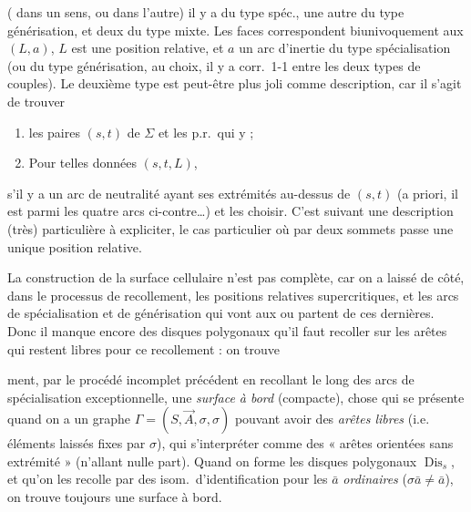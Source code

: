 \documentclass[11pt,a4paper]{article}
\begin{document}
( \struck{\ill{}} dans un sens, ou dans l'autre) \struck{\ill{}}  il y a   du type spéc., une autre du type générisation, et deux du type mixte. Les faces correspondent biunivoquement aux \struck{\ill{}}  $(L, a)$,  $L$ est une position relative, et $a$ un arc  d'inertie du type spécialisation (ou du type générisation, au choix, il y a corr.\ 1-1 entre les deux types de couples). Le deuxième type est peut-être plus joli comme description, car il s'agit de trouver
\begin{enumerate}
\item[a)] les paires  $(s, t)$   de $\Sigma$ et les p.r.\ qui y  ;
\item[b)] Pour \struck{\ill{}} telles données $(s, t, L)$,
\end{enumerate}

s'il y a un arc de neutralité ayant \struck{\ill{}} ses extrémités au-dessus de $(s, t)$ (a priori, il est parmi les quatre arcs ci-contre\ldots) et les choisir. C'est suivant une description (très) particulière à expliciter, le cas particulier où par deux sommets  passe une unique position relative.

La construction de la surface cellulaire n'est pas complète, car on a laissé de côté, dans le processus de recollement, les positions relatives supercritiques, et les arcs de spécialisation et de générisation qui vont aux ou partent de ces dernières. Donc \struck{\ill{}} il manque encore des disques polygonaux qu'il faut recoller sur les arêtes qui restent libres pour ce recollement : on trouve 

ment, par le procédé incomplet précédent en recollant le long des arcs de spécialisation exceptionnelle, une \emph{surface à bord}  (compacte), chose qui se présente quand on a un graphe $\Gamma = (S, \vec{A}, \sigma, \sigma)$ pouvant avoir des  \emph{arêtes libres} (i.e.\  éléments  laissés fixes par $\sigma$), qui \struck{\ill{}}  s'interpréter comme des « arêtes orientées sans extrémité » (n'allant nulle part). Quand on forme les disques polygonaux $\operatorname{Dis}_s$, et qu'on les recolle par des isom.\ d'identification pour les $\bar{a}$ \emph{ordinaires} ($\sigma\bar{a} \neq \bar{a}$), on trouve toujours une surface à bord.
\end{document}

